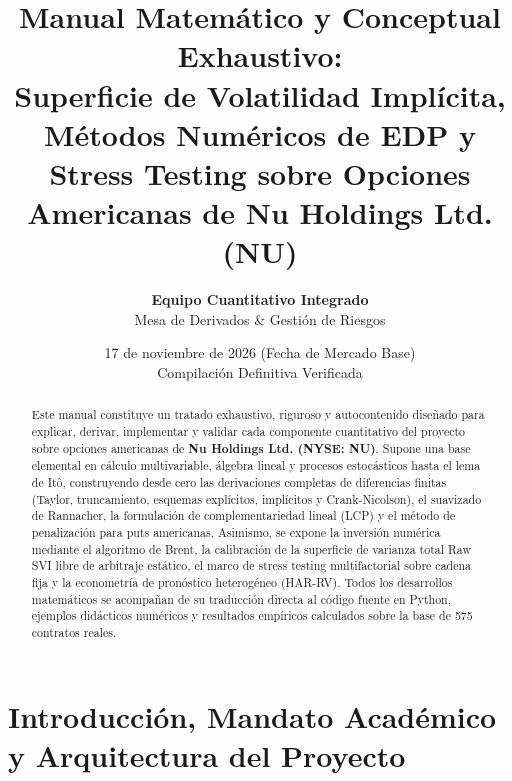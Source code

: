 \documentclass[11pt,a4paper]{article}
\title{\textbf{\LARGE Manual Matemático y Conceptual Exhaustivo:}\\[0.5em]
\Large Superficie de Volatilidad Implícita, Métodos Numéricos de EDP y Stress Testing sobre Opciones Americanas de Nu Holdings Ltd. (NU)}
\author{\textbf{Equipo Cuantitativo Integrado} \\ Mesa de Derivados \& Gestión de Riesgos}
\date{17 de noviembre de 2026 (Fecha de Mercado Base) \\ \small Compilación Definitiva Verificada}
\begin{document}
\maketitle

\begin{abstract}
Este manual constituye un tratado exhaustivo, riguroso y autocontenido diseñado para explicar, derivar, implementar y validar cada componente cuantitativo del proyecto sobre opciones americanas de \textbf{Nu Holdings Ltd. (NYSE: NU)}. Supone una base elemental en cálculo multivariable, álgebra lineal y procesos estocásticos hasta el lema de Itô, construyendo desde cero las derivaciones completas de diferencias finitas (Taylor, truncamiento, esquemas explícitos, implícitos y Crank-Nicolson), el suavizado de Rannacher, la formulación de complementariedad lineal (LCP) y el método de penalización para puts americanas. Asimismo, se expone la inversión numérica mediante el algoritmo de Brent, la calibración de la superficie de varianza total Raw SVI libre de arbitraje estático, el marco de stress testing multifactorial sobre cadena fija y la econometría de pronóstico heterogéneo (HAR-RV). Todos los desarrollos matemáticos se acompañan de su traducción directa al código fuente en Python, ejemplos didácticos numéricos y resultados empíricos calculados sobre la base de 575 contratos reales.
\end{abstract}

\tableofcontents
\newpage

\section{Introducción, Mandato Académico y Arquitectura del Proyecto}
\end{document}
